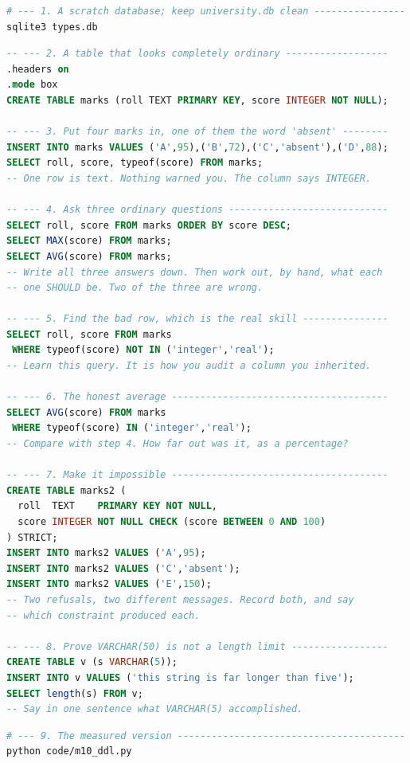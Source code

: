 \begin{lab}
\begin{lstlisting}[language=bash]
# --- 1. A scratch database; keep university.db clean ----------------
sqlite3 types.db
\end{lstlisting}
\begin{lstlisting}[language=sql]
-- --- 2. A table that looks completely ordinary ------------------
.headers on
.mode box
CREATE TABLE marks (roll TEXT PRIMARY KEY, score INTEGER NOT NULL);

-- --- 3. Put four marks in, one of them the word 'absent' --------
INSERT INTO marks VALUES ('A',95),('B',72),('C','absent'),('D',88);
SELECT roll, score, typeof(score) FROM marks;
-- One row is text. Nothing warned you. The column says INTEGER.

-- --- 4. Ask three ordinary questions ----------------------------
SELECT roll, score FROM marks ORDER BY score DESC;
SELECT MAX(score) FROM marks;
SELECT AVG(score) FROM marks;
-- Write all three answers down. Then work out, by hand, what each
-- one SHOULD be. Two of the three are wrong.

-- --- 5. Find the bad row, which is the real skill ---------------
SELECT roll, score FROM marks
 WHERE typeof(score) NOT IN ('integer','real');
-- Learn this query. It is how you audit a column you inherited.

-- --- 6. The honest average --------------------------------------
SELECT AVG(score) FROM marks
 WHERE typeof(score) IN ('integer','real');
-- Compare with step 4. How far out was it, as a percentage?

-- --- 7. Make it impossible --------------------------------------
CREATE TABLE marks2 (
  roll  TEXT    PRIMARY KEY NOT NULL,
  score INTEGER NOT NULL CHECK (score BETWEEN 0 AND 100)
) STRICT;
INSERT INTO marks2 VALUES ('A',95);
INSERT INTO marks2 VALUES ('C','absent');
INSERT INTO marks2 VALUES ('E',150);
-- Two refusals, two different messages. Record both, and say
-- which constraint produced each.

-- --- 8. Prove VARCHAR(50) is not a length limit -----------------
CREATE TABLE v (s VARCHAR(5));
INSERT INTO v VALUES ('this string is far longer than five');
SELECT length(s) FROM v;
-- Say in one sentence what VARCHAR(5) accomplished.
\end{lstlisting}
\begin{lstlisting}[language=bash]
# --- 9. The measured version ----------------------------------------
python code/m10_ddl.py


\end{lstlisting}
\end{lab}
